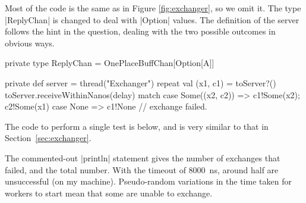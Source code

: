 \begin{answerS}
Most of the code is the same as in Figure \ref{fig:exchanger}, so we omit it.
The type |ReplyChan| is changed to deal with |Option| values.  The definition
of the server follows the hint in the question, dealing with the two possible
outcomes in obvious ways.
%
\begin{scala}
  private type ReplyChan = OnePlaceBuffChan[Option[A]]

  private def server = thread("Exchanger"){
    repeat{
      val (x1, c1) = toServer?()
      toServer.receiveWithinNanos(delay) match{
        case Some((x2, c2)) => c1!Some(x2); c2!Some(x1) 
        case None => c1!None // exchange failed.
      }
    }
  }
\end{scala}

The code to perform a single test is below, and is very similar to that in
Section~\ref{sec:exchanger}.
%
%
The commented-out |println| statement gives the number of exchanges that
failed, and the total number.  With the timeout of 8000~ns, around half are
unsuccessful (on my machine).  Pseudo-random variations in the time taken for
workers to start mean that some are unable to exchange.
\end{answerS}
